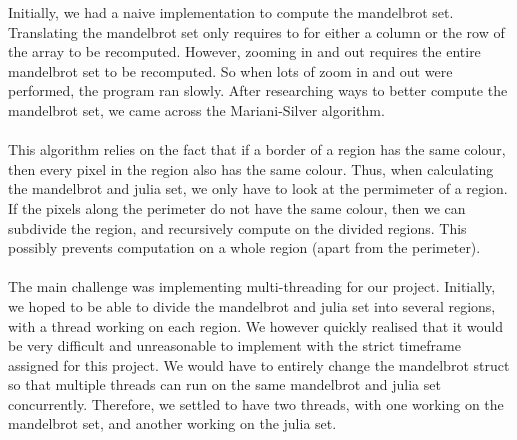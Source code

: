 \documentclass[11pt]{article}
\begin{document}
Initially, we had a naive implementation to compute the mandelbrot set.
Translating the mandelbrot set only requires to for either a column or the row 
of the array to be recomputed. However, zooming in and out requires the entire 
mandelbrot set to be recomputed.
So when lots of zoom in and out were performed, the program ran slowly.
After researching ways to better compute the mandelbrot set, we came across the
Mariani-Silver algorithm.
\\~\\
This algorithm relies on the fact that if a border of a region has the same 
colour, then every pixel in the region also has the same colour. Thus, when
calculating the mandelbrot and julia set, we only have to look at the permimeter
of a region. If the pixels along the perimeter do not have the same colour,
then we can subdivide the region, and recursively compute on the divided 
regions. This possibly prevents computation on a whole region (apart from
the perimeter).
\\~\\
The main challenge was implementing multi-threading for our project. Initially,
we hoped to be able to divide the mandelbrot and julia set into several regions,
with a thread working on each region. We however quickly realised that it would
be very difficult and unreasonable to implement with the strict timeframe
assigned for this project. We would have to entirely change the mandelbrot 
struct so that multiple threads can run on the same mandelbrot and julia set 
concurrently. Therefore, we settled to have two threads, with one working on 
the mandelbrot set, and another working on the julia set. 
\end{document}
